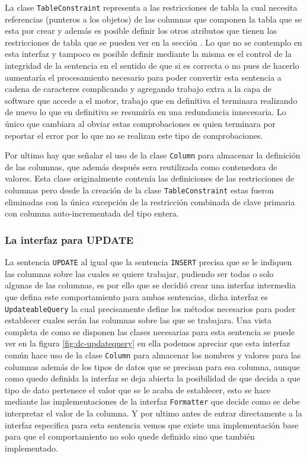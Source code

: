 La clase \verb=TableConstraint= representa a las restricciones de tabla la cual necesita referencias (punteros a los objetos) de las columnas que componen la tabla que se esta por crear y además es posible definir los otros atributos que tienen las restricciones de tabla que se pueden ver en la sección  . Lo que no se contemplo en esta interfaz y tampoco es posible definir mediante la misma es el control de la integridad de la sentencia en el sentido de que si es correcta o no pues de hacerlo aumentaría el procesamiento necesario para poder convertir esta sentencia a cadena de caracteres complicando y agregando trabajo extra a la capa de software que accede a el motor, trabajo que en definitiva el terminara realizando de nuevo lo que en definitiva se resumiría en una redundancia innecesaria. Lo único que cambiara al obviar estas comprobaciones es quien terminara por reportar el error por lo que no se realizan este tipo de comprobaciones.

Por ultimo hay que señalar el uso de la clase \verb=Column= para almacenar la definición de las columnas, que además después sera reutilizada como contenedora de valores. Esta clase originalmente contenía las definiciones de las restricciones de columnas pero desde la creación de la clase \verb=TableConstraint= estas fueron eliminadas con la única excepción de la restricción combinada de clave primaria con columna  auto-incrementada del tipo entera.

\subsubsection{La interfaz para UPDATE}
La sentencia \verb=UPDATE= al igual que la sentencia \verb=INSERT= precisa que se le indiquen las columnas sobre las cuales se quiere trabajar, pudiendo ser todas o solo algunas de las columnas, es por ello que se decidió crear una interfaz intermedia que defina este comportamiento para ambas sentencias, dicha interfaz es \verb=UpdateableQuery= la cual precisamente define los métodos necesarios para poder establecer cuales serán las columnas sobre las que se trabajara. Una vista completa de como se disponen las clases necesarias para esta sentencia se puede ver en la figura \ref{fig:dc-updatequery} en ella podemos apreciar que esta interfaz común hace uso de la clase \verb=Column= para almacenar los nombres y valores para las columnas además de los tipos de datos que se precisan para esa columna, aunque como quedo definida la interfaz se deja abierta la posibilidad de que \jj decida a que tipo de dato pertenece el valor que se le acaba de establecer, esto se hace mediante las implementaciones de la interfaz \verb=Formatter= que decide como se debe interpretar el valor de la columna. Y por ultimo antes de entrar directamente a la interfaz especifica para esta sentencia vemos que existe una implementación base para que el comportamiento no solo quede definido sino que también implementado. 

